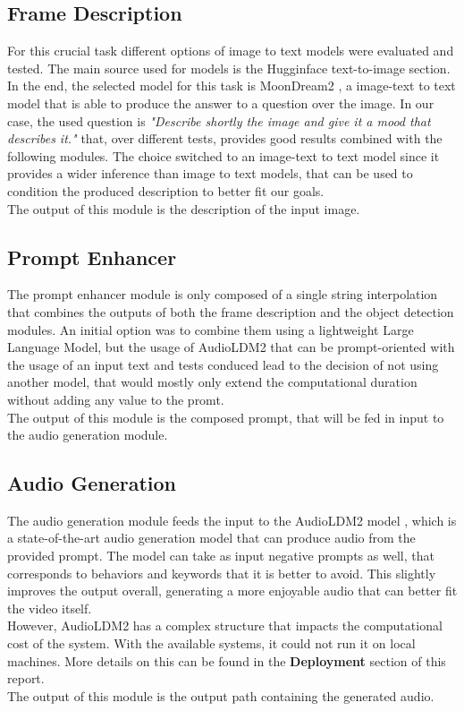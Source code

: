 \documentclass[conference]{IEEEtran}
\begin{document}
\subsection{Frame Description}
For this crucial task different options of image to text models were evaluated and tested. The main source used for models is the Hugginface text-to-image section\cite{hfaceItt}.  
In the end, the selected model for this task is MoonDream2 \cite{moondream2}, a image-text to text model that is able to produce the answer to a question over the image.
In our case, the used question is \emph{"Describe shortly the image and give it a mood that describes it."} that, over different tests, provides good results combined with the following modules.
The choice switched to an image-text to text model since it provides a wider inference than image to text models, that can be used to condition the produced description to better fit our goals.\\
The output of this module is the description of the input image.

\subsection{Prompt Enhancer}
The prompt enhancer module is only composed of a single string interpolation that combines the outputs of both the frame description and the object detection modules. An initial option was to combine them using a lightweight Large Language Model, but the usage of AudioLDM2 that can be prompt-oriented with the usage of an input text and tests conduced lead to the decision of not using another model, that would mostly only extend the computational duration without adding any value to the promt.\\
The output of this module is the composed prompt, that will be fed in input to the audio generation module. 

\subsection{Audio Generation}
The audio generation module feeds the input to the AudioLDM2 model \cite{audioldm2}, which is a state-of-the-art audio generation model that can produce audio from the provided prompt. The model can take as input negative prompts as well, that corresponds to behaviors and keywords that it is better to avoid. 
This slightly improves the output overall, generating a more enjoyable audio that can better fit the video itself.\\
However, AudioLDM2 has a complex structure that impacts the computational cost of the system. With the available systems, it could not run it on local machines. More details on this can be found in the \textbf{Deployment} section of this report.\\
The output of this module is the output path containing the generated audio.
\end{document}
